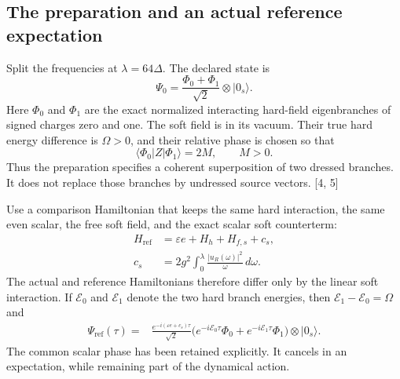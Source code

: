\documentclass[10pt,twocolumn,letterpaper]{article}
\begin{document}
\subsection{The preparation and an actual reference expectation}
Split the frequencies at $\lambda=64\Delta$. The declared state is
\begin{equation}
\Psi_0=\frac{\Phi_0+\Phi_1}{\sqrt2}\otimes|0_s\rangle.\tag{23}\label{eq:clock-preparation}
\end{equation}
Here $\Phi_0$ and $\Phi_1$ are the exact normalized interacting hard-field eigenbranches of signed charges zero and one. The soft field is in its vacuum. Their true hard energy difference is $\Omega>0$, and their relative phase is chosen so that
\[
\langle\Phi_0|Z|\Phi_1\rangle=2M,\qquad M>0.
\]
Thus the preparation specifies a coherent superposition of two dressed branches. It does not replace those branches by undressed source vectors. [4, 5]

Use a comparison Hamiltonian that keeps the same hard interaction, the same even scalar, the free soft field, and the exact scalar soft counterterm:
\[
\begin{aligned}
H_{\mathrm{ref}}&=\varepsilon e+H_h+H_{f,s}+c_s,\\
c_s&=2g^2\int_0^\lambda\frac{|u_R(\omega)|^2}{\omega}\,d\omega.
\end{aligned}
\]
The actual and reference Hamiltonians therefore differ only by the linear soft interaction. If $\mathcal E_0$ and $\mathcal E_1$ denote the two hard branch energies, then $\mathcal E_1-\mathcal E_0=\Omega$ and
\[
\begin{aligned}
\Psi_{\mathrm{ref}}(\tau)
={}&\frac{e^{-i(\varepsilon e+c_s)\tau}}{\sqrt2}
\bigl(e^{-i\mathcal E_0\tau}\Phi_0
     +e^{-i\mathcal E_1\tau}\Phi_1\bigr)
\otimes|0_s\rangle.
\end{aligned}
\]
The common scalar phase has been retained explicitly. It cancels in an expectation, while remaining part of the dynamical action.
\end{document}
